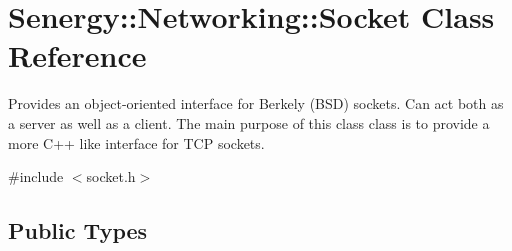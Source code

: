 \hypertarget{class_senergy_1_1_networking_1_1_socket}{\section{Senergy\-:\-:Networking\-:\-:Socket Class Reference}
\label{class_senergy_1_1_networking_1_1_socket}
}


Provides an object-\/oriented interface for Berkely (B\-S\-D) sockets. Can act both as a server as well as a client. The main purpose of this class class is to provide a more C++ like interface for T\-C\-P sockets.  




{\ttfamily \#include $<$socket.\-h$>$}

\subsection*{Public Types}
